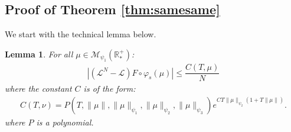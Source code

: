 \documentclass[11pt,a4paper]{article}
\newcommand{\RR}{\mathbb{R}}
\newcommand{\RRP}{\mathbb{R}^+_*}
\newcommand{\MC}{\mathcal{M}}
\newcommand{\LC}{\mathcal{L}}
\newtheorem{lemma}[theorem]{Lemma}
\begin{document}

\subsection{Proof of Theorem \ref{thm:samesame}}
We start with the technical lemma below.
\begin{lemma}\label{lem:bounds_diff_gen}
For all $\mu \in \MC_{\psi_1}(\RRP)$:
\begin{align*}
    \left| \left(\LC^N - \LC\right)F\circ \varphi_s (\mu) \right| \leq \dfrac{C(T,\mu)}{N}
\end{align*}
where the constant $C$ is of the form:
    \begin{align*}
        C(T,\nu) = P(T,\|\mu\|,\|\mu\|_{\psi_1},\|\mu\|_{\psi_2},\|\mu\|_{\psi_3}) e^{CT\|\mu\|_{\psi_2}(1 + T\|\mu\|)}.
    \end{align*}
    where $P$ is a polynomial.
\end{lemma}
\end{document}
